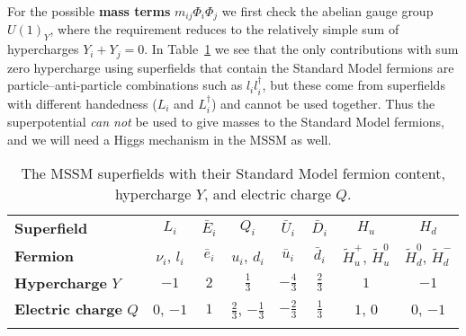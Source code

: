 \documentclass[notes.tex]{subfiles}
\begin{document}
For the possible {\bf mass terms} $m_{ij}\Phi_i\Phi_j$ we first check the abelian gauge group $U(1)_Y$, where the requirement reduces to the relatively simple sum of hypercharges $Y_i + Y_j = 0$. In Table~\ref{tab:hyper} we see that the only contributions  with sum zero hypercharge using  superfields that contain the Standard Model fermions are particle--anti-particle combinations such as $l_i l_i^\dagger$, but these come from superfields with different handedness ($L_i$ and $L_i^\dagger$) and cannot be used together. Thus the superpotential {\it can not} be used to give masses to the Standard Model fermions, and we will need a Higgs mechanism in the MSSM as well.

\begin{table}[h]
\begin{center}
\begin{tabular}{l | c | c | c | c | c | c | c  } 
\noalign{\smallskip}\hline\noalign{\smallskip}
{\bf Superfield} & $L_i$ & $\bar{E}_i$ & $Q_i$ & $\bar{U}_i$ & $\bar{D}_i$ & $H_u$ & $H_d$  \\
\noalign{\smallskip}\hline\noalign{\smallskip} 
{\bf Fermion}    & $\nu_i$, $l_i$ & $\bar e_i$ & $u_i$, $d_i$ & $\bar u_i$ & $\bar d_i$ & $\tilde H_u^+$, $\tilde H_u^0$ & $\tilde H_d^0$, $\tilde H_d^-$ \\
{\bf Hypercharge} $Y$ & $-1$ & $2$ & $\frac{1}{3}$ & $-\frac{4}{3}$ & $\frac{2}{3}$ & $1$ & $-1$ \\
{\bf Electric charge} $Q$ & $0$, $-1$ & $1$ & $\frac{2}{3}$, $-\frac{1}{3}$ & $-\frac{2}{3}$ & $\frac{1}{3}$ & $1$, $0$ & $0$, $-1$ \\
\noalign{\smallskip}\hline\noalign{\smallskip}
\end{tabular}
\caption{The MSSM superfields with their Standard Model fermion content, hypercharge $Y$, and electric charge $Q$.}
\label{tab:hyper}
\end{center}
\end{table}
\end{document}
